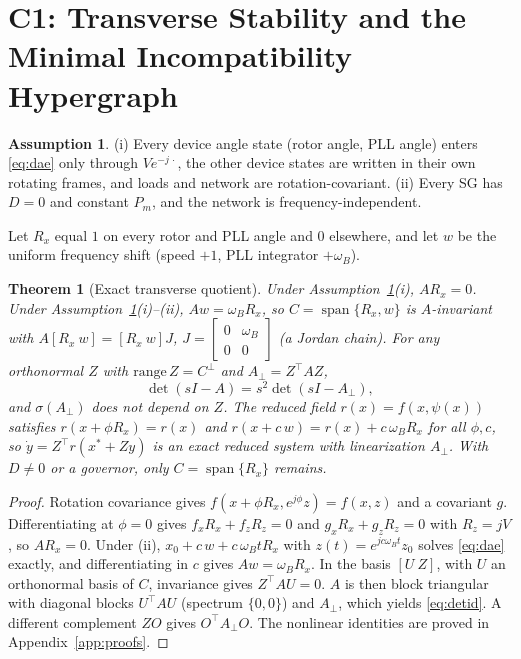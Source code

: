 \documentclass[journal]{IEEEtran}
\newtheorem{theorem}{Theorem}
\theoremstyle{definition}
\newtheorem{assumption}{Assumption}
\theoremstyle{remark}
\newcommand{\Aperp}{A_{\perp}}
\DeclareMathOperator{\spanop}{span}
\begin{document}
\section{C1: Transverse Stability and the Minimal Incompatibility Hypergraph}\label{sec:c1}

\begin{assumption}\label{ass:sym}
(i) Every device angle state (rotor angle, PLL angle) enters \eqref{eq:dae}
only through $V e^{-j\,\cdot}$, the other device states are written in their
own rotating frames, and loads and network are rotation-covariant.
(ii) Every SG has $D=0$ and constant $P_m$, and the network is
frequency-independent.
\end{assumption}

Let $R_x$ equal $1$ on every rotor and PLL angle and $0$ elsewhere, and let $w$
be the uniform frequency shift (speed $+1$, PLL integrator $+\omega_B$).

\begin{theorem}[Exact transverse quotient]\label{thm:transverse}
Under Assumption~\ref{ass:sym}(i), $A R_x=0$. Under Assumption~\ref{ass:sym}(i)--(ii),
$A w=\omega_B R_x$, so $C=\spanop\{R_x,w\}$ is $A$-invariant with
$A[R_x\ w]=[R_x\ w]J$, $J=\left[\begin{smallmatrix}0&\omega_B\\0&0
\end{smallmatrix}\right]$ (a Jordan chain). For any orthonormal $Z$ with
$\mathrm{range}\,Z=C^\perp$ and $\Aperp=Z^\top A Z$,
\begin{equation}\label{eq:detid}
\det(sI-A)=s^2\det(sI-\Aperp),
\end{equation}
and $\sigma(\Aperp)$ does not depend on $Z$. The reduced field
$r(x)=f(x,\psi(x))$ satisfies $r(x+\phi R_x)=r(x)$ and
$r(x+c\,w)=r(x)+c\,\omega_B R_x$ for all $\phi,c$, so $\dot y = Z^\top r(x^*+Zy)$
is an exact reduced system with linearization $\Aperp$. With $D\neq0$ or a
governor, only $C=\spanop\{R_x\}$ remains.
\end{theorem}
\begin{proof}
Rotation covariance gives $f(x+\phi R_x,e^{j\phi}z)=f(x,z)$ and a covariant
$g$. Differentiating at $\phi=0$ gives $f_xR_x+f_zR_z=0$ and $g_xR_x+g_zR_z=0$
with $R_z=jV$, so $AR_x=0$. Under (ii), $x_0+c\,w+c\,\omega_B tR_x$ with
$z(t)=e^{jc\omega_B t}z_0$ solves \eqref{eq:dae} exactly, and differentiating
in $c$ gives $Aw=\omega_BR_x$. In the basis $[U\ Z]$, with $U$ an orthonormal
basis of $C$, invariance gives $Z^\top AU=0$. $A$ is then block triangular with
diagonal blocks $U^\top AU$ (spectrum $\{0,0\}$) and $\Aperp$, which yields
\eqref{eq:detid}. A different complement $ZO$ gives $O^\top\Aperp O$. The
nonlinear identities are proved in Appendix~\ref{app:proofs}.
\end{proof}
\end{document}

